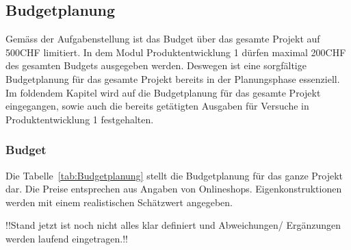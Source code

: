 \documentclass[main.tex]{subfiles} %
\begin{document}
\begin{landscape}
\section{Budgetplanung}

Gemäss der Aufgabenstellung ist das Budget über das gesamte Projekt auf 500CHF limitiert.
In dem Modul Produktentwicklung 1 dürfen maximal 200CHF des gesamten Budgets ausgegeben werden.
Deswegen ist eine sorgfältige Budgetplanung für das gesamte Projekt bereits in der Planungsphase
essenziell. Im foldendem Kapitel wird auf die Budgetplanung für das gesamte Projekt eingegangen,
sowie auch die bereits getätigten Ausgaben für Versuche in Produktentwicklung 1 festgehalten.

\subsubsection*{Budget}
Die Tabelle~\ref{tab:Budgetplanung} stellt die Budgetplanung für das ganze Projekt dar. Die Preise 
entsprechen aus Angaben von Onlineshops. Eigenkonstruktionen werden mit einem realistischen 
Schätzwert angegeben.

!!Stand jetzt ist noch nicht alles klar definiert und Abweichungen/ Ergänzungen werden laufend eingetragen.!!


\end{landscape}
\end{document}
